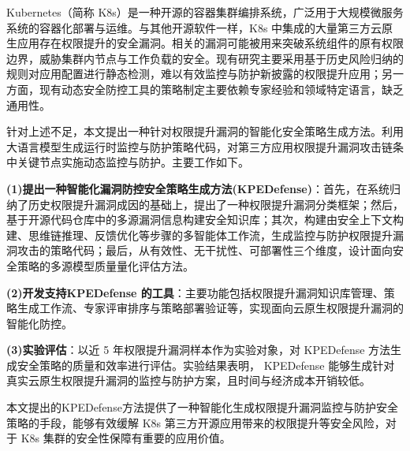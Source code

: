 ﻿%
\begin{ChineseAbstract}
    
Kubernetes（简称 K8s）是一种开源的容器集群编排系统，广泛用于大规模微服务系统的容器化部署与运维。与其他开源软件一样，K8s 中集成的大量第三方云原生应用存在权限提升的安全漏洞。相关的漏洞可能被用来突破系统组件的原有权限边界，威胁集群内节点与工作负载的安全。现有研究主要采用基于历史风险归纳的规则对应用配置进行静态检测，难以有效监控与防护新披露的权限提升应用；另一方面，现有动态安全防控工具的策略制定主要依赖专家经验和领域特定语言，缺乏通用性。

针对上述不足，本文提出一种针对权限提升漏洞的智能化安全策略生成方法。利用大语言模型生成运行时监控与防护策略代码，对第三方应用权限提升漏洞攻击链条中关键节点实施动态监控与防护。主要工作如下。

\textbf{(1)提出一种智能化漏洞防控安全策略生成方法(KPEDefense)}：首先，在系统归纳了历史权限提升漏洞成因的基础上，提出了一种权限提升漏洞分类框架；然后，基于开源代码仓库中的多源漏洞信息构建安全知识库；其次，构建由安全上下文构建、思维链推理、反馈优化等步骤的多智能体工作流，生成监控与防护权限提升漏洞攻击的策略代码；最后，从有效性、无干扰性、可部署性三个维度，设计面向安全策略的多源模型质量量化评估方法。

\textbf{(2)开发支持KPEDefense 的工具}：主要功能包括权限提升漏洞知识库管理、策略生成工作流、专家评审排序与策略部署验证等，实现面向云原生权限提升漏洞的智能化防控。

\textbf{(3)实验评估}：以近 5 年权限提升漏洞样本作为实验对象，对 KPEDefense 方法生成安全策略的质量和效率进行评估。实验结果表明， KPEDefense 能够生成针对真实云原生权限提升漏洞的监控与防护方案，且时间与经济成本开销较低。

本文提出的KPEDefense方法提供了一种智能化生成权限提升漏洞监控与防护安全策略的手段，能够有效缓解 K8s 第三方开源应用带来的权限提升等安全风险，对于 K8s 集群的安全性保障有重要的应用价值。

\end{ChineseAbstract}

